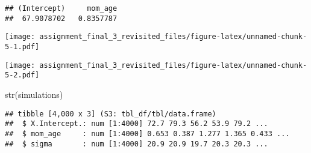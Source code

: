 \documentclass[
]{article}
\newenvironment{Shaded}{\begin{snugshade}}{\end{snugshade}}
\newcommand{\AttributeTok}[1]{\textcolor[rgb]{0.77,0.63,0.00}{#1}}
\newcommand{\CommentTok}[1]{\textcolor[rgb]{0.56,0.35,0.01}{\textit{#1}}}
\newcommand{\FunctionTok}[1]{\textcolor[rgb]{0.00,0.00,0.00}{#1}}
\newcommand{\NormalTok}[1]{#1}
\newcommand{\OtherTok}[1]{\textcolor[rgb]{0.56,0.35,0.01}{#1}}
\newcommand{\SpecialCharTok}[1]{\textcolor[rgb]{0.00,0.00,0.00}{#1}}
\newcommand{\StringTok}[1]{\textcolor[rgb]{0.31,0.60,0.02}{#1}}
\begin{document}
\begin{verbatim}
## (Intercept)     mom_age 
##  67.9078702   0.8357787
\end{verbatim}

\begin{Shaded}
\end{Shaded}

\texttt{[image: assignment\_final\_3\_revisited\_files/figure-latex/unnamed-chunk-5-1.pdf]}

\begin{Shaded}
\end{Shaded}

\texttt{[image: assignment\_final\_3\_revisited\_files/figure-latex/unnamed-chunk-5-2.pdf]}

\begin{Shaded}
\begin{Highlighting}[]
\FunctionTok{str}\NormalTok{(simulations)}
\end{Highlighting}
\end{Shaded}

\begin{verbatim}
## tibble [4,000 x 3] (S3: tbl_df/tbl/data.frame)
##  $ X.Intercept.: num [1:4000] 72.7 79.3 56.2 53.9 79.2 ...
##  $ mom_age     : num [1:4000] 0.653 0.387 1.277 1.365 0.433 ...
##  $ sigma       : num [1:4000] 20.9 20.9 19.7 20.3 20.3 ...
\end{verbatim}
\end{document}
